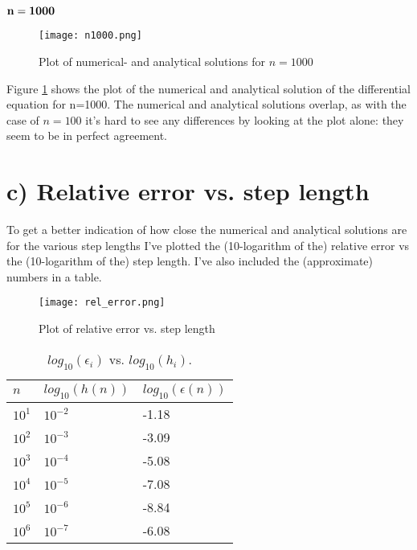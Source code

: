 \documentclass[norsk,a4paper,12pt]{article}
\begin{document}
\subsection*{$\bf{n=1000}$}
\begin{figure}[ht!]
    \centering
    \texttt{[image: n1000.png]}     
    \caption{Plot of numerical- and analytical solutions for $n = 1000$}
    \label{fig:plot_n1000}
\end{figure}

Figure \ref{fig:plot_n1000} shows the plot of the numerical and analytical solution of the differential equation for n=1000. The numerical and analytical solutions overlap, as with the case of $n=100$ it's hard to see any differences by looking at the plot alone: they seem to be in perfect agreement.
 
\section{c) Relative error vs. step length}
To get a better indication of how close the numerical and analytical solutions are for the various step lengths I've plotted the (10-logarithm of the) relative error vs the (10-logarithm of the) step length. I've also included the (approximate) numbers in a table.

\begin{figure}[ht!]
    \centering
    \texttt{[image: rel\_error.png]}     
    \caption{Plot of relative error vs. step length}
    \label{fig:rel_error}
\end{figure}


\begin{table}[ht!]
	\caption{$log_{10}(\epsilon_i)$ vs. $log_{10}(h_i)$.}
    \begin{tabular}{|l|l|l|}
    \hline
    $n$     & $log_{10}(h(n))$			  & $log_{10} (\epsilon (n))$ \\ \hline
    $10^1$ & $10^{-2}$                & -1.18                            \\ \hline
    $10^2$ & $10^{-3}$                & -3.09                            \\ \hline
    $10^3$ & $10^{-4}$                & -5.08                            \\ \hline
    $10^4$ & $10^{-5}$                & -7.08                            \\ \hline
    $10^5$ & $10^{-6}$                & -8.84                            \\ \hline
    $10^6$ & $10^{-7}$                & -6.08                            \\ \hline
    \end{tabular}
    \label{tab:rel_error}
\end{table}
\end{document}
